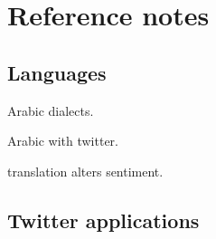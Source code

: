 \documentclass[sigconf,10pt]{acmart}
\begin{document}
\noindent

\noindent

\noindent

\noindent

\noindent

\noindent

\noindent

\noindent

\noindent

\noindent

\noindent

\noindent

\noindent

\noindent

\noindent

\noindent

\noindent

\noindent

\noindent

\noindent


\newpage
\section{Reference notes}


\subsection{Languages}

\citet{zaidan2014arabic} Arabic dialects.

\citet{refaee2014arabic} Arabic with twitter.

\citet{mohammad2016translation} translation alters sentiment.


\subsection{Twitter applications}
\end{document}
